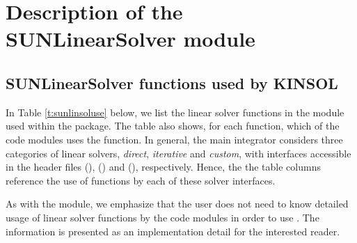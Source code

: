 \chapter{Description of the SUNLinearSolver module}\label{s:sunlinsol}



\section{SUNLinearSolver functions used by KINSOL}

In Table \ref{t:sunlinsoluse} below, we list the linear solver
functions in the {\sunlinsol} module used within the {\kinsol} package.
The table also shows, for each function, which of the code modules uses
the function.  In general, the main {\kinsol} integrator considers
three categories of linear solvers, \emph{direct}, \emph{iterative}
and \emph{custom}, with interfaces accessible in the {\kinsol} header
files  ({\kindls}), 
({\kinspils}) and  ({\kincls}), respectively.
Hence, the the table columns reference the use of {\sunlinsol}
functions by each of these solver interfaces.

As with the {\sunmatrix} module, we emphasize that the {\kinsol} user
does not need to know detailed usage of linear solver functions by the
{\kinsol} code modules in order to use {\kinsol}. The information is
presented as an implementation detail for the interested reader.

